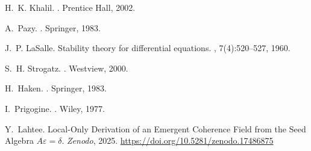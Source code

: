 \documentclass[12pt,a4paper]{article}
\begin{document}
\begin{thebibliography}{10}

H.~K. Khalil.
.
\newblock Prentice Hall, 2002.

A.~Pazy.
.
\newblock Springer, 1983.

J.~P. LaSalle.
\newblock Stability theory for differential equations.
, 7(4):520--527, 1960.

S.~H. Strogatz.
.
\newblock Westview, 2000.

H.~Haken.
.
\newblock Springer, 1983.

I.~Prigogine.
.
\newblock Wiley, 1977.

Y.~Lahtee.
\newblock Local-Only Derivation of an Emergent Coherence Field from the Seed Algebra \(A\varepsilon=\delta\).
\newblock \textit{Zenodo}, 2025. \href{https://doi.org/10.5281/zenodo.17486875}{https://doi.org/10.5281/zenodo.17486875}

\end{thebibliography}
\end{document}
